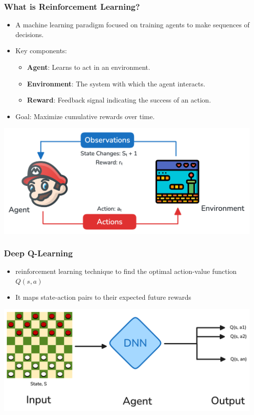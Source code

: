 \begin{frame}
	\frametitle{What is Reinforcement Learning?}
	\vspace{0.2cm}
	\begin{itemize}
		\item A machine learning paradigm focused on training agents to make sequences of decisions.
		\item Key components:
		\begin{itemize}
			\item \textbf{Agent}: Learns to act in an environment.
			\item \textbf{Environment}: The system with which the agent interacts.
			\item  \textbf{Reward}: Feedback signal indicating the success of an action.
		\end{itemize}
		\item Goal: Maximize cumulative rewards over time.
	\end{itemize}
	\centering
	\includegraphics[scale=0.25]{rl_agent_env}
\end{frame}



\begin{frame}
	\frametitle{Deep Q-Learning}
	\vspace{0.5cm}
		\begin{itemize}	
			\item reinforcement learning technique to find the optimal action-value function $Q(s,a)$
			\item It maps state-action pairs to their expected future rewards
		\end{itemize}
		 \centering
		\includegraphics[scale=0.15]{dqn_checkers}
			
\end{frame}

